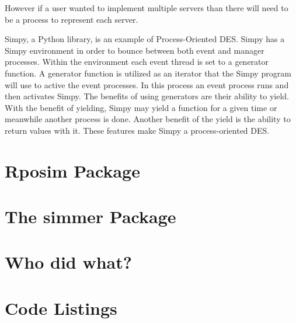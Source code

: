 \documentclass[a4paper]{article}
\begin{document}
	However if a user wanted to implement multiple servers than there will need to be a process to represent each server. 
	\\
    \par Simpy, a Python library, is an example of Process-Oriented DES. Simpy has a Simpy environment in order to bounce between both event and manager processes. Within the environment each event thread is set to a generator function. A generator function is utilized as an iterator that the Simpy program will use to active the event processes. In this process an event process runs and then activates Simpy. The benefits of using generators are their ability to yield. With the benefit of yielding, Simpy may yield a function for a given time or meanwhile another process is done. Another benefit of the yield is the ability to return values with it. These features make Simpy a process-oriented DES.


\section{Rposim Package}


\section{The simmer Package}


\section{Who did what?}




\section{Code Listings}
\end{document}
